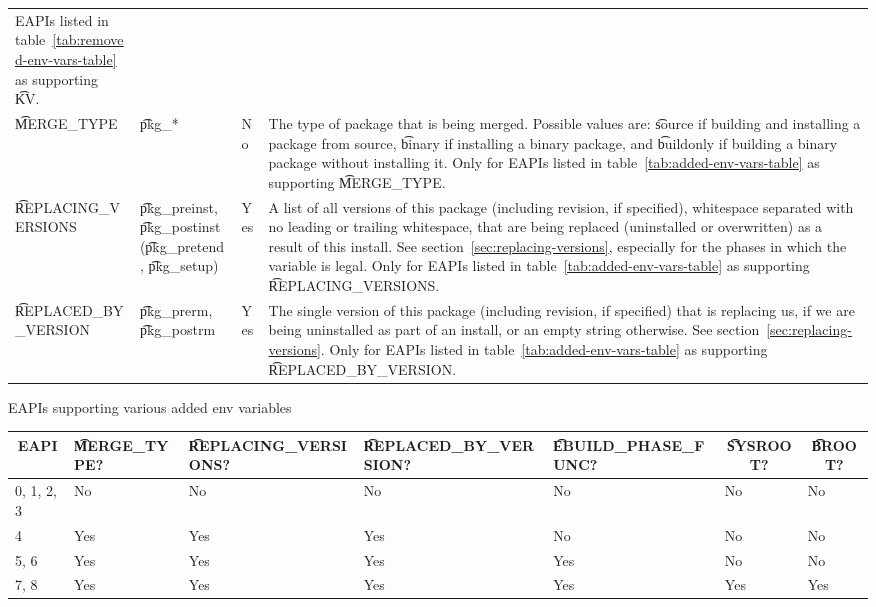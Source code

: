 \begin{landscape}
\begin{longtable}{!{\extracolsep{\fill}} l P{7.5em} l p{35em}}
    EAPIs listed in table~\ref{tab:removed-env-vars-table} as supporting \t{KV}. \\
\t{MERGE_TYPE} &
    \t{pkg_*} &
    No &
     The type of package that is being merged. Possible values are:
    \t{source} if building and installing a package from source, \t{binary} if installing a binary
    package, and \t{buildonly} if building a binary package without installing it. Only for EAPIs
    listed in table~\ref{tab:added-env-vars-table} as supporting \t{MERGE_TYPE}. \\
\t{REPLACING_VERSIONS} &
    \t{pkg_preinst}, \t{pkg_postinst} (\t{pkg_pretend}, \t{pkg_setup}) &
    Yes &
    A list of all versions of this package (including revision, if specified), whitespace separated
    with no leading or trailing whitespace, that are being replaced (uninstalled or overwritten)
    as a result of this install. See section~\ref{sec:replacing-versions}, especially for the phases
    in which the variable is legal. Only for EAPIs listed in table~\ref{tab:added-env-vars-table}
    as supporting \t{REPLACING_VERSIONS}. \\
\t{REPLACED_BY_VERSION} &
    \t{pkg_prerm}, \t{pkg_postrm} &
    Yes &
    The single version of this package (including revision, if specified) that is replacing us,
    if we are being uninstalled as part of an install, or an empty string otherwise.
    See section~\ref{sec:replacing-versions}. Only for EAPIs listed in
    table~\ref{tab:added-env-vars-table} as supporting \t{REPLACED_BY_VERSION}. \\
\end{longtable}
\end{landscape}

\begin{centertable}{EAPIs supporting various added env variables}
    \label{tab:added-env-vars-table}
    \begin{tabular}{lllllll}
      \toprule
      \multicolumn{1}{c}{\textbf{EAPI}} &
      \multicolumn{1}{P{3.25em}}{\textbf{\t{MERGE_TYPE}?}} &
      \multicolumn{1}{P{5.25em}}{\textbf{\t{REPLACING_VERSIONS}?}} &
      \multicolumn{1}{P{5.75em}}{\textbf{\t{REPLACED_BY_VERSION}?}} &
      \multicolumn{1}{P{5.75em}}{\textbf{\t{EBUILD_PHASE_FUNC}?}} &
      \multicolumn{1}{c}{\textbf{\t{SYSROOT}?}} &
      \multicolumn{1}{c}{\textbf{\t{BROOT}?}} \\
      \midrule
      0, 1, 2, 3        & No  & No  & No  & No  & No  & No  \\
      4                 & Yes & Yes & Yes & No  & No  & No  \\
      5, 6              & Yes & Yes & Yes & Yes & No  & No  \\
      7, 8              & Yes & Yes & Yes & Yes & Yes & Yes \\
      \bottomrule
    \end{tabular}
\end{centertable}

